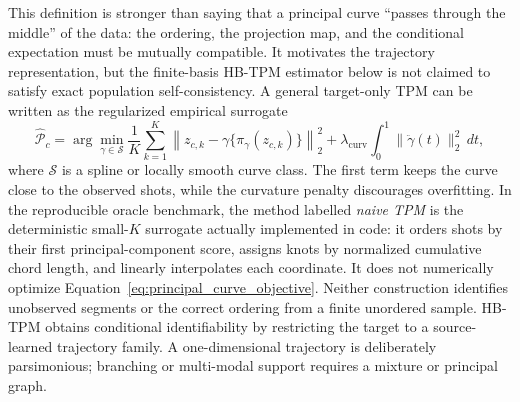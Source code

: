 \documentclass{article}
\begin{document}
This definition is stronger than saying that a principal curve ``passes through the middle'' of the data: the ordering, the projection map, and the conditional expectation must be mutually compatible. It motivates the trajectory representation, but the finite-basis HB-TPM estimator below is not claimed to satisfy exact population self-consistency. A general target-only TPM can be written as the regularized empirical surrogate
\begin{equation}
	\widehat{\mathcal{P}}_c
	=
	\arg\min_{\gamma\in\mathcal{S}}
	\frac{1}{K}\sum_{k=1}^{K}
	\left\lVert
		z_{c,k}-\gamma\{\pi_\gamma(z_{c,k})\}
	\right\rVert_2^2
	+
	\lambda_{\mathrm{curv}}
	\int_0^1 \lVert \ddot{\gamma}(t)\rVert_2^2\,dt ,
	\label{eq:principal_curve_objective}
\end{equation}
where $\mathcal{S}$ is a spline or locally smooth curve class. The first term keeps the curve close to the observed shots, while the curvature penalty discourages overfitting. In the reproducible oracle benchmark, the method labelled \emph{naive TPM} is the deterministic small-$K$ surrogate actually implemented in code: it orders shots by their first principal-component score, assigns knots by normalized cumulative chord length, and linearly interpolates each coordinate. It does not numerically optimize Equation~\ref{eq:principal_curve_objective}. Neither construction identifies unobserved segments or the correct ordering from a finite unordered sample. HB-TPM obtains conditional identifiability by restricting the target to a source-learned trajectory family. A one-dimensional trajectory is deliberately parsimonious; branching or multi-modal support requires a mixture or principal graph.
\end{document}
